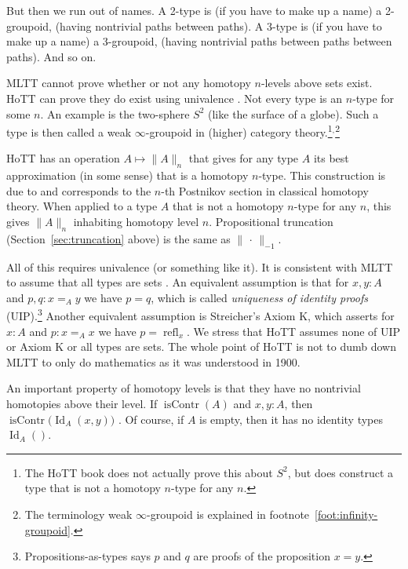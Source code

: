 \documentclass[11pt]{article}
\DeclareMathOperator{\idtype}{Id}
\DeclareMathOperator{\isContr}{isContr}
\DeclareMathOperator{\refl}{refl}
\newcommand{\proptrunc}[1]{\lVert #1 \rVert}
\newcommand{\fatdot}{\,\cdot\,}
\begin{document}
But then we run out of names.  A 2-type is (if you have to make up
a name) a 2-groupoid, (having nontrivial paths between paths).
A 3-type is (if you have to make up
a name) a 3-groupoid, (having nontrivial paths between paths between paths).
And so on.

MLTT cannot prove whether or not any homotopy $n$-levels above sets exist.
HoTT can prove they do exist
using univalence .
Not every type is an $n$-type for some $n$.
An example is the two-sphere $S^2$ (like the surface of a globe).
Such a type is then called a weak $\infty$-groupoid in (higher)
category theory.\footnote{The HoTT book does not actually prove this about
$S^2$, but does construct  a type that
is not a homotopy $n$-type for any $n$.}$^,$\footnote{The terminology
weak $\infty$-groupoid is explained in footnote~\ref{foot:infinity-groupoid}.}

HoTT has  an operation
$A \mapsto \proptrunc{A}_n$ that gives for any type $A$ its best approximation
(in some sense) that is a homotopy $n$-type.  This construction is due
to \citet{voevodsky} and corresponds to
the $n$-th Postnikov section in classical
homotopy theory.  When applied to a type $A$ that is not a homotopy $n$-type
for any $n$, this gives $\proptrunc{A}_n$ inhabiting homotopy level $n$.
Propositional truncation (Section~\ref{sec:truncation} above) is the
same as $\proptrunc{\fatdot}_{-1}$.

All of this requires univalence (or something like it).
It is consistent with MLTT to assume that all types are sets
.
An equivalent assumption is that for $x, y : A$ and $p, q : x =_A y$
we have $p = q$, which is called \emph{uniqueness of identity proofs}
(UIP).\footnote{Propositions-as-types says $p$ and $q$ are proofs
of the proposition $x = y$.}
Another equivalent assumption is Streicher’s Axiom K, which asserts
for $x : A$ and $p : x =_A x$ we have $p = \refl_x$.
We stress that HoTT assumes none of UIP or Axiom K or all types are sets.
The whole point of HoTT is not to dumb down MLTT to only do mathematics
as it was understood in 1900.

An important property of homotopy levels is that they have no nontrivial
homotopies above their level.  If $\isContr(A)$ and $x, y : A$, then
$\isContr\bigl(\idtype_A(x, y)\bigr)$
.
Of course, if $A$ is empty, then it has no identity types $\idtype_A()$.
\end{document}
